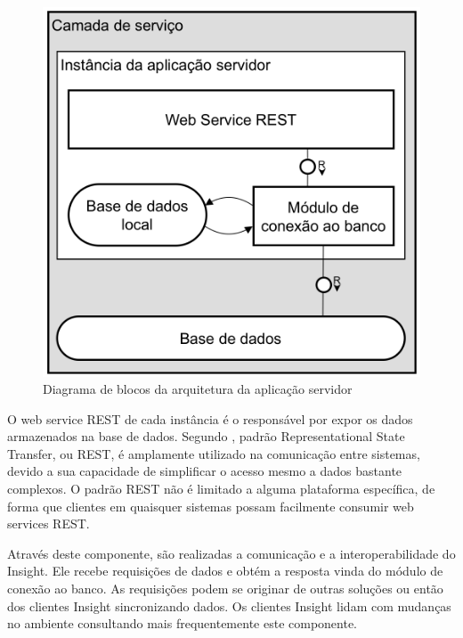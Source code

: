 \documentclass[twoside,english,brazilian]{UNISINOSartigo}
\begin{document}
\begin{figure}[!ht]
	\caption{Diagrama de blocos da arquitetura da aplicação servidor}
	\label{fig:arquiteturaInstancia}
	\centering%
	\begin{minipage}{.4\textwidth}
		\includegraphics[width=\textwidth]{imgs/arquiteturaInstancia.png}
	\end{minipage}
\end{figure}

O web service REST de cada instância é o responsável por expor os dados armazenados na base de dados. Segundo , padrão Representational State Transfer, ou REST, é amplamente utilizado na comunicação entre sistemas, devido a sua capacidade de simplificar o acesso mesmo a dados bastante complexos. O padrão REST não é limitado a alguma plataforma específica, de forma que clientes em quaisquer sistemas possam facilmente consumir web services REST. 

Através deste componente, são realizadas a comunicação e a interoperabilidade do Insight. Ele recebe requisições de dados e obtém a resposta vinda do módulo de conexão ao banco. As requisições podem se originar de outras soluções ou então dos clientes Insight sincronizando dados. Os clientes Insight lidam com mudanças no ambiente consultando mais frequentemente este componente.
\end{document}
